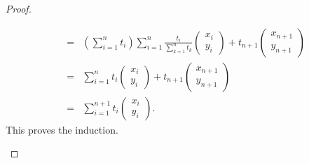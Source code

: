 \begin{proof}
\begin{enumerate}
\begin{eqnarray*}
        & = & \left(\sum_{i=1}^n t_i\right)\sum_{i=1}^n \frac{t_i}{\sum_{k=1}^n t_k} \left(\begin{array}{c} x_i\\ y_i\end{array}\right) + t_{n+1}\left(\begin{array}{c} x_{n+1}\\ y_{n+1}\end{array}\right)\\
        & = & \sum_{i=1}^n t_i \left(\begin{array}{c} x_i\\ y_i\end{array}\right) + t_{n+1}\left(\begin{array}{c} x_{n+1}\\ y_{n+1}\end{array}\right)\\
        & = & \sum_{i=1}^{n+1} t_i \left(\begin{array}{c} x_i\\ y_i\end{array}\right).
    \end{eqnarray*}
    This proves the induction.
    \end{enumerate}
\end{proof}

